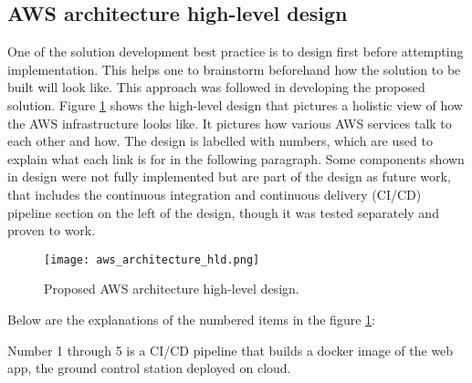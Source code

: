 \subsection{AWS architecture high-level design}
\label{subsec:aws-architecture-hld}

One of the solution development best practice is to design first before attempting implementation. This helps one to brainstorm beforehand how the solution to be built will look like. This approach was followed in developing the proposed solution. Figure \ref{fig:aws-architecture-hld} shows the high-level design that pictures a holistic view of how the AWS infrastructure looks like. It pictures how various AWS services talk to each other and how. The design is labelled with numbers, which are used to explain what each link is for in the following paragraph. Some components shown in design were not fully implemented but are part of the design as future work, that includes the continuous integration and continuous delivery (CI/CD) pipeline section on the left of the design, though it was tested separately and proven to work.

\begin{figure}[H]
    \centering \texttt{[image: aws\_architecture\_hld.png]}
    \caption{Proposed AWS architecture high-level design.}
    \label{fig:aws-architecture-hld}
\end{figure}

Below are the explanations of the numbered items in the figure \ref{fig:aws-architecture-hld}:

Number 1 through 5 is a CI/CD pipeline that builds a docker image of the web app, the ground control station deployed on cloud.

